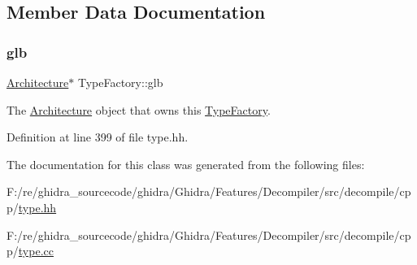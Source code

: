 \subsection{Member Data Documentation}
\mbox{\label{class_type_factory_a0652ec9d4b9d9d0943d1fbffe9b9c740}} 
\subsubsection{\texorpdfstring{glb}{glb}}
{\footnotesize\ttfamily \mbox{\hyperlink{class_architecture}{Architecture}}$\ast$ Type\+Factory\+::glb\hspace{0.3cm}{\ttfamily [protected]}}



The \mbox{\hyperlink{class_architecture}{Architecture}} object that owns this \mbox{\hyperlink{class_type_factory}{Type\+Factory}}. 



Definition at line 399 of file type.\+hh.



The documentation for this class was generated from the following files\+:\begin{DoxyCompactItemize}
\item 
F\+:/re/ghidra\+\_\+sourcecode/ghidra/\+Ghidra/\+Features/\+Decompiler/src/decompile/cpp/\mbox{\hyperlink{type_8hh}{type.\+hh}}\item 
F\+:/re/ghidra\+\_\+sourcecode/ghidra/\+Ghidra/\+Features/\+Decompiler/src/decompile/cpp/\mbox{\hyperlink{type_8cc}{type.\+cc}}\end{DoxyCompactItemize}
